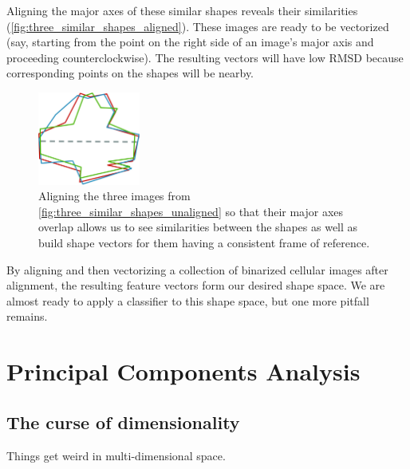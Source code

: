 Aligning the major axes of these similar shapes reveals their similarities (\autoref{fig:three_similar_shapes_aligned}). These images are ready to be vectorized (say, starting from the point on the right side of an image's major axis and proceeding counterclockwise). The resulting vectors will have low RMSD because corresponding points on the shapes will be nearby.\\

\begin{figure}[h]
\centering
\mySfFamily
\includegraphics[width = 0.3\textwidth]{../images_CMYK/three_similar_shapes_aligned}
\caption{Aligning the three images from \autoref{fig:three_similar_shapes_unaligned} so that their major axes overlap allows us to see similarities between the shapes as well as build shape vectors for them having a consistent frame of reference.}
\label{fig:three_similar_shapes_aligned}
\end{figure}

\begin{note}\end{note}

By aligning and then vectorizing a collection of binarized cellular images after alignment, the resulting feature vectors form our desired shape space. We are almost ready to apply a classifier to this shape space, but one more pitfall remains.\\


\FloatBarrier
{}

\section{Principal Components Analysis}
\label{sec:pca}

\subsection{The curse of dimensionality}

Things get weird in multi-dimensional space.

